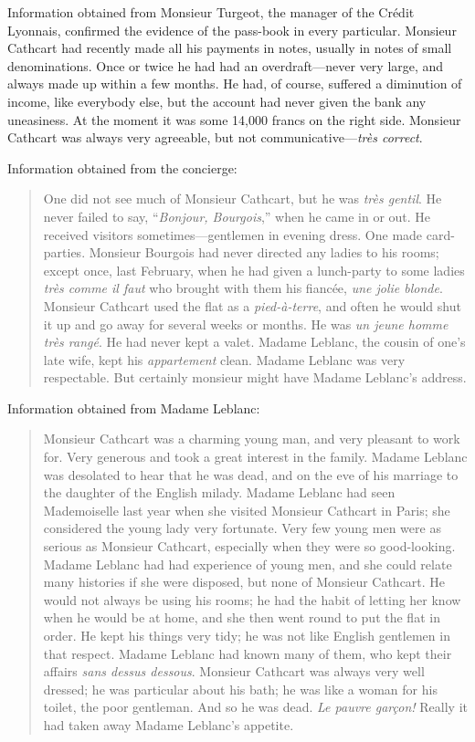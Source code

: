 Information obtained from Monsieur Turgeot, the manager of the Crédit Lyonnais, confirmed the evidence of the pass-book in every particular.  Monsieur Cathcart had recently made all his payments in notes, usually in notes of small denominations. Once or twice he had had an overdraft—never very large, and always made up within a few months. He had, of course, suffered a diminution of income, like everybody else, but the account had never given the bank any uneasiness. At the moment it was some 14,000 francs on the right side. Monsieur Cathcart was always very agreeable, but not communicative—\foreignlanguage{french}{\textit{très correct}}.


Information obtained from the concierge:
\begin{quote}
One did not see much of Monsieur Cathcart, but he was \foreignlanguage{french}{\textit{très gentil}}.  He never failed to say, \foreignquote{french}{\textit{Bonjour, Bourgois},} when he came in or out. He received visitors sometimes—gentlemen in evening dress. One made card-parties. Monsieur Bourgois had never directed any ladies to his rooms; except once, last February, when he had given a lunch-party to some ladies \textit{très comme il faut} who brought with them his fiancée, \foreignlanguage{french}{\textit{une jolie blonde}}. Monsieur Cathcart used the flat as a \foreignlanguage{french}{\textit{pied-à-terre}}, and often he would shut it up and go away for several weeks or months. He was \foreignlanguage{french}{\textit{un jeune homme très rangé}}. He had never kept a valet. Madame Leblanc, the cousin of one's late wife, kept his \textit{appartement} clean. Madame Leblanc was very respectable. But certainly monsieur might have Madame Leblanc's address.
\end{quote}

Information obtained from Madame Leblanc:

\begin{quote}
Monsieur Cathcart was a charming young man, and very pleasant to work for. Very generous and took a great interest in the family. Madame Leblanc was desolated to hear that he was dead, and on the eve of his marriage to the daughter of the English milady. Madame Leblanc had seen Mademoiselle last year when she visited Monsieur Cathcart in Paris; she considered the young lady very fortunate. Very few young men were as serious as Monsieur Cathcart, especially when they were so good-looking. Madame Leblanc had had experience of young men, and she could relate many histories if she were disposed, but none of Monsieur Cathcart. He would not always be using his rooms; he had the habit of letting her know when he would be at home, and she then went round to put the flat in order. He kept his things very tidy; he was not like English gentlemen in that respect. Madame Leblanc had known many of them, who kept their affairs \foreignlanguage{french}{\textit{sans dessus dessous}}. Monsieur Cathcart was always very well dressed; he was particular about his bath; he was like a woman for his toilet, the poor gentleman. And so he was dead. \foreignlanguage{french}{\textit{Le pauvre garçon!}} Really it had taken away Madame Leblanc's appetite.
\end{quote}

